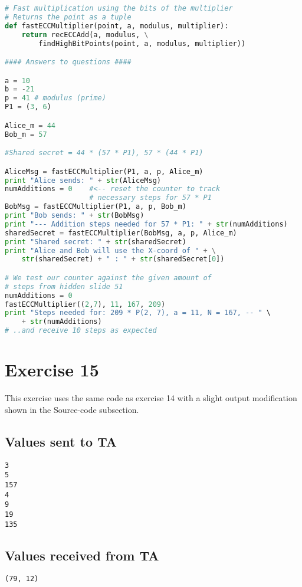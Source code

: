 \documentclass[a4paper]{article}
\begin{document}
\begin{lstlisting}[language=Python]
# Fast multiplication using the bits of the multiplier
# Returns the point as a tuple
def fastECCMultiplier(point, a, modulus, multiplier):
	return recECCAdd(a, modulus, \
		findHighBitPoints(point, a, modulus, multiplier))

#### Answers to questions ####

a = 10
b = -21
p = 41 # modulus (prime)
P1 = (3, 6)

Alice_m = 44
Bob_m = 57

#Shared secret = 44 * (57 * P1), 57 * (44 * P1)

AliceMsg = fastECCMultiplier(P1, a, p, Alice_m)
print "Alice sends: " + str(AliceMsg)
numAdditions = 0 	#<-- reset the counter to track
					# necessary steps for 57 * P1
BobMsg = fastECCMultiplier(P1, a, p, Bob_m)
print "Bob sends: " + str(BobMsg)
print "--- Addition steps needed for 57 * P1: " + str(numAdditions)
sharedSecret = fastECCMultiplier(BobMsg, a, p, Alice_m)
print "Shared secret: " + str(sharedSecret)
print "Alice and Bob will use the X-coord of " + \
	str(sharedSecret) + " : " + str(sharedSecret[0])

# We test our counter against the given amount of
# steps from hidden slide 51
numAdditions = 0
fastECCMultiplier((2,7), 11, 167, 209)
print "Steps needed for: 209 * P(2, 7), a = 11, N = 167, -- " \
	+ str(numAdditions)
# ..and receive 10 steps as expected

\end{lstlisting}

\section*{Exercise 15}
This exercise uses the same code as exercise 14 with a slight
output modification shown in the Source-code subsection.

\subsection*{Values sent to TA}
\begin{verbatim}
3
5
157
4
9
19
135
\end{verbatim}

\subsection*{Values received from TA}

\begin{verbatim}
(79, 12)
\end{verbatim}
\end{document}
